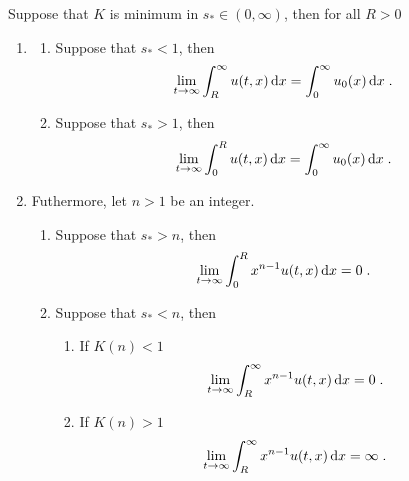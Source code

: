 \documentclass[11pt]{amsart}
\newcommand{\diff}{\,\mathrm{d}}
\begin{document}
        \begin{proposition}
            \label{p:locationmoment} Suppose that $K$ is minimum in $s_* \in (0, \infty)$, then for all $R > 0$
            \begin{enumerate}
                \item 
                \begin{enumerate}
                    \item Suppose that $s_* < 1$, then
                        \begin{align*}
                        \lim_{t\to \infty} \int_R^\infty u(t,x) \diff x = \int_0^\infty u_0(x) \diff x
                        \eqfinp
                        \end{align*}
                    \item Suppose that $s_* > 1$, then
                        \begin{align*}
                        \lim_{t\to \infty} \int_0^R u(t,x) \diff x = \int_0^\infty u_0(x) \diff x
                        \eqfinp
                        \end{align*}
                \end{enumerate}
                \item Futhermore, let $n > 1$ be an integer.
                    \begin{enumerate}
                    \item Suppose that $s_* > n$, then 
                        \begin{align*}
                        \lim_{t\to \infty} \int_0^R x^{n-1} u(t,x) \diff x = 0
                        \eqfinp
                        \end{align*}
                    \item Suppose that $s_* < n$, then 
                    \begin{enumerate}
                    \item If $K(n) < 1$
                        \begin{align*}
                        \lim_{t\to \infty} \int_R^{\infty} x^{n-1} u(t,x) \diff x = 0
                        \eqfinp
                        \end{align*}
                    \item If $K(n) > 1$
                        \begin{align*}
                        \lim_{t\to \infty} \int_R^{\infty} x^{n-1} u(t,x) \diff x = \infty
                        \eqfinp
                        \end{align*}
                \end{enumerate}
            \end{enumerate}
        \end{enumerate}
        \end{proposition}
        
\end{document}
